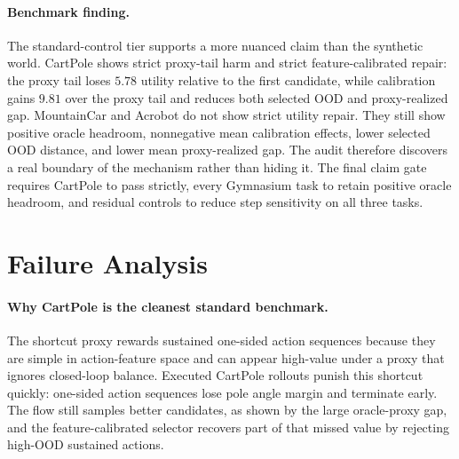 \documentclass[10pt]{article}
\begin{document}
\begin{table}[t]
\centering
\caption{Held-out Gymnasium effects at \(N=32\), mean with bootstrap 95\% interval in parentheses. Positive values are better for the first three columns; negative values are better for gap, OOD, and residual.}
\label{tab:gym}
\end{table}

\paragraph{Benchmark finding.}
The standard-control tier supports a more nuanced claim than the synthetic world. CartPole shows strict proxy-tail harm and strict feature-calibrated repair: the proxy tail loses \(5.78\) utility relative to the first candidate, while calibration gains \(9.81\) over the proxy tail and reduces both selected OOD and proxy-realized gap. MountainCar and Acrobot do not show strict utility repair. They still show positive oracle headroom, nonnegative mean calibration effects, lower selected OOD distance, and lower mean proxy-realized gap. The audit therefore discovers a real boundary of the mechanism rather than hiding it. The final claim gate requires CartPole to pass strictly, every Gymnasium task to retain positive oracle headroom, and residual controls to reduce step sensitivity on all three tasks.

\section{Failure Analysis}

\paragraph{Why CartPole is the cleanest standard benchmark.}
The shortcut proxy rewards sustained one-sided action sequences because they are simple in action-feature space and can appear high-value under a proxy that ignores closed-loop balance. Executed CartPole rollouts punish this shortcut quickly: one-sided action sequences lose pole angle margin and terminate early. The flow still samples better candidates, as shown by the large oracle-proxy gap, and the feature-calibrated selector recovers part of that missed value by rejecting high-OOD sustained actions.
\end{document}
